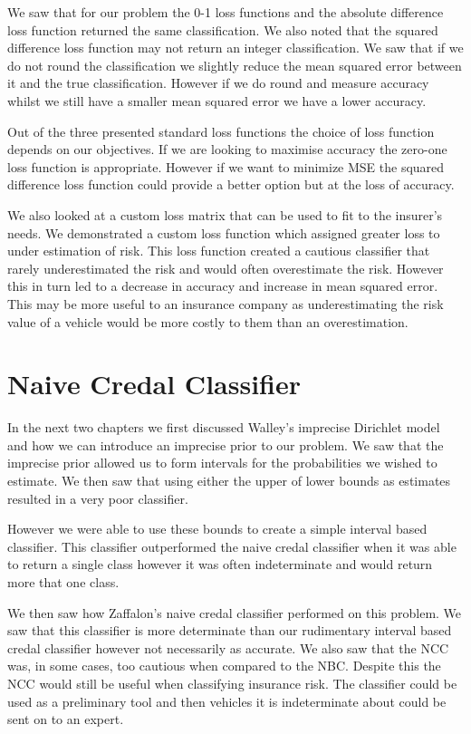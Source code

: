 We saw that for our problem the 0-1 loss functions and the absolute difference loss function returned the same classification.
We also noted that the squared difference loss function may not return an integer classification.
We saw that if we do not round the classification we slightly reduce the mean squared error between it and the true classification.
However if we do round and measure accuracy whilst we still have a smaller mean squared error we have a lower accuracy.

Out of the three presented standard loss functions the choice of loss function depends on our objectives.
If we are looking to maximise accuracy the zero-one loss function is appropriate.
However if we want to minimize MSE the squared difference loss function could provide a better option but at the loss of accuracy.

We also looked at a custom loss matrix that can be used to fit to the insurer's needs.
We demonstrated a custom loss function which assigned greater loss to under estimation of risk.
This loss function created a cautious classifier that rarely underestimated the risk and would often overestimate the risk.
However this in turn led to a decrease in accuracy and increase in mean squared error.
This may be more useful to an insurance company as underestimating the risk value of a vehicle would be more costly to them than an overestimation.

\section{Naive Credal Classifier}

In the next two chapters we first discussed Walley's imprecise Dirichlet model \cite{Walley96} and how we can introduce an imprecise prior to our problem.
We saw that the imprecise prior allowed us to form intervals for the probabilities we wished to estimate.
We then saw that using either the upper of lower bounds as estimates resulted in a very poor classifier.

However we were able to use these bounds to create a simple interval based classifier.
This classifier outperformed the naive credal classifier when it was able to return a single class however it was often indeterminate and would return more that one class.

We then saw how Zaffalon's naive credal classifier \cite{Zaffalon01} performed on this problem.
We saw that this classifier is more determinate than our rudimentary interval based credal classifier however not necessarily as accurate.
We also saw that the NCC was, in some cases, too cautious when compared to the NBC.
Despite this the NCC would still be useful when classifying insurance risk.
The classifier could be used as a preliminary tool and then vehicles it is indeterminate about could be sent on to an expert.

